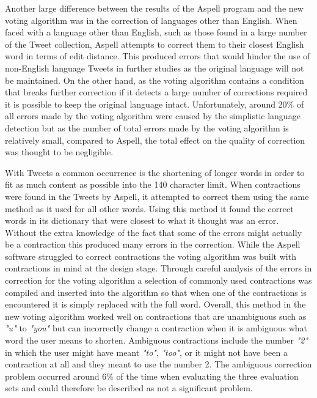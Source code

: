 Another large difference between the results of the Aspell program and the new voting algorithm was in the correction of languages other than English. When faced with a language other than English, such as those found in a large number of the Tweet collection, Aspell attempts to correct them to their closest English word in terms of edit distance. This produced errors that would hinder the use of non-English language Tweets in further studies as the original language will not be maintained. On the other hand, as the voting algorithm contains a condition that breaks further correction if it detects a large number of corrections required it is possible to keep the original language intact. Unfortunately, around 20\% of all errors made by the voting algorithm were caused by the simplistic language detection but as the number of total errors made by the voting algorithm is relatively small, compared to Aspell, the total effect on the quality of correction was thought to be negligible.

With Tweets a common occurrence is the shortening of longer words in order to fit as much content as possible into the 140 character limit. When contractions were found in the Tweets by Aspell, it attempted to correct them using the same method as it used for all other words. Using this method it found the correct words in its dictionary that were closest to what it thought was an error. Without the extra knowledge of the fact that some of the errors might actually be a contraction this produced many errors in the correction. While the Aspell software struggled to correct contractions the voting algorithm was built with contractions in mind at the design stage. Through careful analysis of the errors in correction for the voting algorithm a selection of commonly used contractions was compiled and inserted into the algorithm so that when one of the contractions is encountered it is simply replaced with the full word. Overall, this method in the new voting algorithm worked well on contractions that are unambiguous such as \emph{"u"} to \emph{"you"} but can incorrectly change a contraction when it is ambiguous what word the user means to shorten. Ambiguous contractions include the number \emph{"2"} in which the user might have meant \emph{"to"}, \emph{"too"}, or it might not have been a contraction at all and they meant to use the number 2. The ambiguous correction problem occurred around 6\% of the time when evaluating the three evaluation sets and could therefore be described as not a significant problem.

